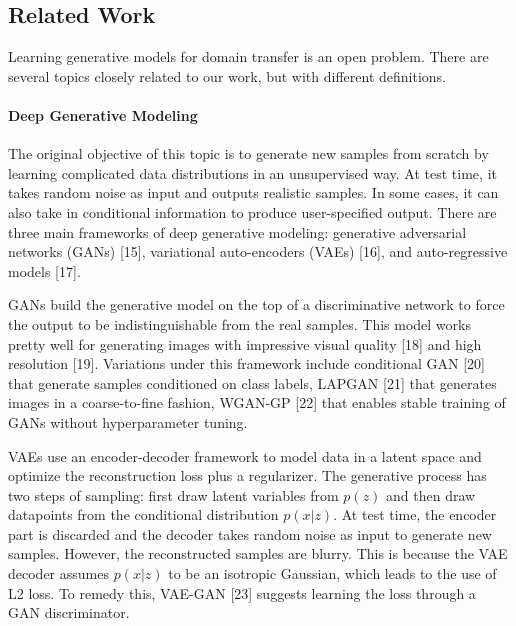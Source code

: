 \documentclass{article}
\begin{document}
\subsection{Related Work}
Learning generative models for domain transfer is an open problem. There are several topics closely related to our work, but with different definitions.

\paragraph{Deep Generative Modeling}
The original objective of this topic is to generate new samples from scratch by learning complicated data distributions in an unsupervised way. At test time, it takes random noise as input and outputs realistic samples. In some cases, it can also take in conditional information to produce user-specified output. There are three main frameworks of deep generative modeling: generative adversarial networks (GANs) [15], variational auto-encoders (VAEs) [16], and auto-regressive models [17].

GANs build the generative model on the top of a discriminative network to force the output to be indistinguishable from the real samples. This model works pretty well for generating images with impressive visual quality [18] and high resolution [19]. Variations under this framework include conditional GAN [20] that generate samples conditioned on class labels, LAPGAN [21] that generates images in a coarse-to-fine fashion, WGAN-GP [22] that enables stable training of GANs without hyperparameter tuning.

VAEs use an encoder-decoder framework to model data in a latent space and optimize the reconstruction loss plus a regularizer. The generative process has two steps of sampling: first draw latent variables from $p(z)$ and then draw datapoints from the conditional distribution $p(x|z)$. At test time, the encoder part is discarded and the decoder takes random noise as input to generate new samples. However, the reconstructed samples are blurry. This is because the VAE decoder assumes $p(x|z)$ to be an isotropic Gaussian, which leads to the use of L2 loss. To remedy this, VAE-GAN [23] suggests learning the loss through a GAN discriminator.
\end{document}
